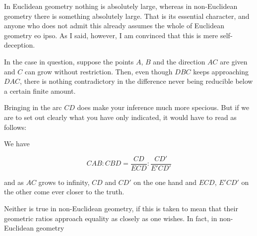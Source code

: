 %
In Euclidean geometry nothing is absolutely large, whereas in non-Euclidean geometry there is something absolutely large. That is its essential character, and anyone who does not admit this already assumes the whole of Euclidean geometry eo ipso. As I said, however, I am convinced that this is mere self-deception.

In the case in question, suppose the points $A$, $B$ and the direction $AC$ are given and $C$ can grow without restriction. Then, even though $DBC$ keeps approaching $DAC$, there is nothing contradictory in the difference never being reducible below a certain finite amount.

\begin{center}

\end{center}

\Needspace{9cm}
 Bringing in the arc $CD$ does make your inference much more specious. But if we are to set out clearly what you have only indicated, it would have to read as follows:

\begin{center}

\end{center}

We have

\[
CAB:CBD=\frac{CD}{ECD}:\frac{CD'}{E'CD'}
\]

\noindent and as $AC$ grows to infinity, $CD$ and $CD'$ on the one hand and $ECD$, $E'CD'$ on the other come ever closer to the truth.

Neither is true in non-Euclidean geometry, if this is taken to mean that their geometric ratios approach equality as closely as one wishes. In fact, in non-Euclidean geometry
